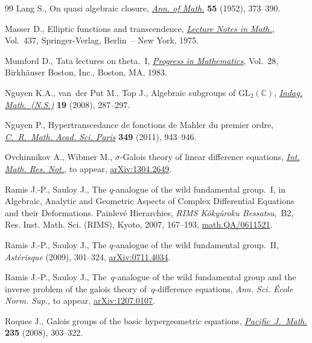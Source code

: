 \documentclass[pdftex]{sigma}
\numberwithin{equation}{section}
\begin{document}
\begin{thebibliography}{99}
Lang S., On quasi algebraic closure, \href{http://dx.doi.org/10.2307/1969785}{\textit{Ann. of Math.}} \textbf{55} (1952), 373--390.

Masser D., Elliptic functions and transcendence, \href{http://dx.doi.org/10.1007/BFb0069432}{\textit{Lecture Notes in
Math.}}, Vol.~437, Springer-Verlag, Berlin~-- New York, 1975.

Mumford D., Tata lectures on theta.~{I}, \href{http://dx.doi.org/10.1007/978-1-4899-2843-6}{\textit{Progress in
Mathematics}}, Vol.~28, Birkh\"auser Boston, Inc., Boston, MA, 1983.

Nguyen K.A., van~der Put M., Top J., Algebraic subgroups of {${\text{GL}}_2({\mathbb{C}})$},
\href{http://dx.doi.org/10.1016/S0019-3577(08)80004-3}{\textit{Indag. Math.~(N.S.)}} \textbf{19} (2008), 287--297.

Nguyen P., Hypertranscedance de fonctions de {M}ahler du premier ordre,
\href{http://dx.doi.org/10.1016/j.crma.2011.08.021}{\textit{C.~R.~Math. Acad. Sci. Paris}} \textbf{349} (2011), 943--946.

Ovchinnikov A., Wibmer M., {$\sigma$}-{G}alois theory of linear dif\/ference equations,
\href{http://dx.doi.org/10.1093/imrn/rnu060}{\textit{Int. Math. Res. Not.}}, {t}o appear, \href{http://arxiv.org/abs/1304.2649}{arXiv:1304.2649}.

Ramis J.-P., Sauloy J., The {$q$}-analogue of the wild fundamental group.~{I}, in Algebraic, Analytic and Geo\-metric
Aspects of Complex Dif\/ferential Equations and their Deformations.
{P}ainlev\'e Hierarchies, \textit{RIMS K\^oky\^uroku Bessatsu},~B2, Res. Inst. Math. Sci. (RIMS), Kyoto, 2007, 167--193, \href{http://arxiv.org/abs/#2}{math.QA/0611521}.

Ramis J.-P., Sauloy J., The {$q$}-analogue of the wild fundamental group.~{II}, \textit{Ast\'erisque} (2009), 301--324,
\href{http://arxiv.org/abs/0711.4034}{arXiv:0711.4034}.

Ramis J.-P., Sauloy J., The~$q$-analogue of the wild fundamental group and the inverse problem of the galois theory
of~$q$-dif\/ference equations, \textit{Ann. Sci. \'Ecole Norm. Sup.}, {t}o appear, \href{http://arxiv.org/abs/1207.0107}{arXiv:1207.0107}.

Roques J., Galois groups of the basic hypergeometric equations,
\href{http://dx.doi.org/10.2140/pjm.2008.235.303}{\textit{Pacific~J.~Math.}} \textbf{235} (2008), 303--322.


\end{thebibliography}
\end{document}
